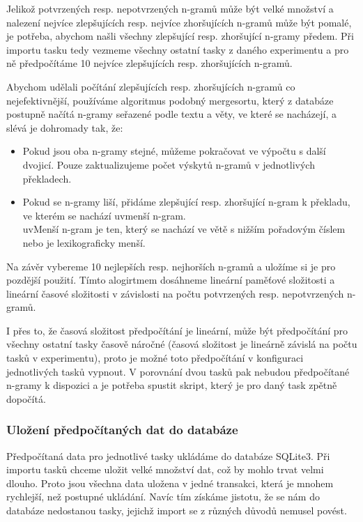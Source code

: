 Jelikož potvrzených resp. nepotvrzených n-gramů může být velké množství
  a nalezení nejvíce zlepšujících resp. nejvíce zhoršujících n-gramů může být pomalé,
  je potřeba,
  abychom našli všechny zlepšující resp. zhoršující n-gramy předem.
Při importu tasku tedy vezmeme všechny ostatní tasky z daného experimentu
  a pro ně předpočítáme 10 nejvíce zlepšujících resp. zhoršujících n-gramů. 

Abychom udělali počítání zlepšujících resp. zhoršujících n-gramů co nejefektivnější,
  používáme algoritmus podobný mergesortu,
  který z databáze postupně načítá n-gramy seřazené podle textu a věty, ve které se nacházejí, 
  a slévá je dohromady tak, že:

\begin{itemize}
  \item Pokud jsou oba n-gramy stejné, můžeme pokračovat ve výpočtu s další dvojicí.
    Pouze zaktualizujeme počet výskytů n-gramů v jednotlivých překladech. 
  \item Pokud se n-gramy liší, přidáme zlepšující resp. zhoršující n-gram k překladu,
    ve kterém se nachází uv{menší n-gram}. \\
    uv{Menší n-gram} je ten, který se nachází ve větě s nižším pořadovým číslem
    nebo je lexikograficky menší.
\end{itemize}

Na závěr vybereme 10 nejlepších resp. nejhorších n-gramů
  a uložíme si je pro pozdější použití.
Tímto alogirtmem dosáhneme lineární paměťové složitosti a
  lineární časové složitosti v závislosti na počtu potvrzených resp. nepotvrzených n-gramů.

I přes to, že časová složitost předpočítání je lineární,
  může být předpočítání pro všechny ostatní tasky časově náročné
  (časová složitost je lineárně závislá na počtu tasků v experimentu),
  proto je možné toto předpočítání v konfiguraci jednotlivých tasků vypnout.
V porovnání dvou tasků pak nebudou předpočítané n-gramy k dispozici
  a je potřeba spustit skript,
  který je pro daný task zpětně dopočítá.

\subsubsection{Uložení předpočítaných dat do databáze}
Předpočítaná data pro jednotlivé tasky ukládáme do databáze SQLite3.
Při importu tasků chceme uložit velké množství dat,
  což by mohlo trvat velmi dlouho.
Proto jsou všechna data uložena v jedné transakci,
  která je mnohem rychlejší,
  než postupné ukládání.
Navíc tím získáme jistotu,
  že se nám do databáze nedostanou tasky,
  jejichž import se z různých důvodů nemusel povést.
 
